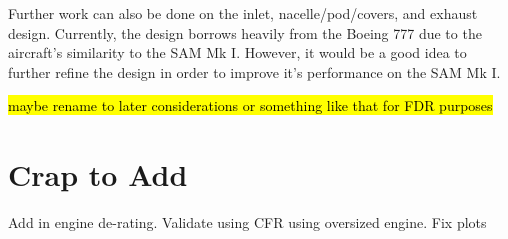 Further work can also be done on the inlet, nacelle/pod/covers, and exhaust design. Currently, the design borrows heavily from the Boeing 777 due to the aircraft's similarity to the SAM Mk I. However, it would be a good idea to further refine the design in order to improve it's performance on the SAM Mk I.

\hl{maybe rename to later considerations or something like that for FDR purposes}

\section{Crap to Add}

Add in engine de-rating. Validate using CFR using oversized engine. Fix plots



